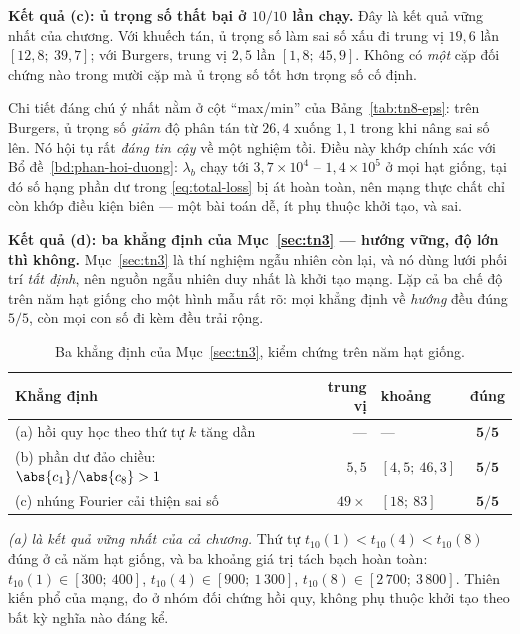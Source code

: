 \textbf{Kết quả (c): ủ trọng số thất bại ở $10/10$ lần chạy.} Đây là kết quả
vững nhất của chương. Với khuếch tán, ủ trọng số làm sai số xấu đi trung vị
$19{,}6$ lần $[12{,}8;\ 39{,}7]$; với Burgers, trung vị $2{,}5$ lần
$[1{,}8;\ 45{,}9]$. Không có \emph{một} cặp đối chứng nào trong mười cặp mà ủ
trọng số tốt hơn trọng số cố định.

Chi tiết đáng chú ý nhất nằm ở cột ``max/min'' của
Bảng~\ref{tab:tn8-eps}: trên Burgers, ủ trọng số \emph{giảm} độ phân tán từ
$26{,}4$ xuống $1{,}1$ trong khi nâng sai số lên. Nó hội tụ rất \emph{đáng tin
cậy} về một nghiệm tồi. Điều này khớp chính xác với
Bổ đề~\ref{bd:phan-hoi-duong}: $\lambda_b$ chạy tới $3{,}7\times10^{4}$ --
$1{,}4\times10^{5}$ ở mọi hạt giống, tại đó số hạng phần dư trong
\eqref{eq:total-loss} bị át hoàn toàn, nên mạng thực chất chỉ còn khớp điều kiện
biên --- một bài toán dễ, ít phụ thuộc khởi tạo, và sai.

\textbf{Kết quả (d): ba khẳng định của Mục~\ref{sec:tn3} --- hướng vững, độ lớn
thì không.} Mục~\ref{sec:tn3} là thí nghiệm ngẫu nhiên còn lại, và nó dùng lưới
phối trí \emph{tất định}, nên nguồn ngẫu nhiên duy nhất là khởi tạo mạng. Lặp cả
ba chế độ trên năm hạt giống cho một hình mẫu rất rõ: mọi khẳng định về
\emph{hướng} đều đúng $5/5$, còn mọi con số đi kèm đều trải rộng.

\begin{table}[H]
\centering
\caption[Ba khẳng định của Thí nghiệm 3 trên năm hạt giống]{Ba khẳng định của
Mục~\ref{sec:tn3}, kiểm chứng trên năm hạt giống.}
\label{tab:tn8-pho}
\small
\setlength{\tabcolsep}{5pt}
\begin{tabular}{@{}p{5.3cm} r l c@{}}
\toprule
\textbf{Khẳng định} & \textbf{trung vị} & \textbf{khoảng} & \textbf{đúng} \\
\midrule
(a) hồi quy học theo thứ tự $k$ tăng dần
  & --- & --- & $\mathbf{5/5}$ \\
(b) phần dư đảo chiều: $\abs{c_1}/\abs{c_8} > 1$
  & $5{,}5$ & $[4{,}5;\ 46{,}3]$ & $\mathbf{5/5}$ \\
(c) nhúng Fourier cải thiện sai số
  & $49\times$ & $[18;\ 83]$ & $\mathbf{5/5}$ \\
\bottomrule
\end{tabular}
\end{table}

\emph{(a) là kết quả vững nhất của cả chương.} Thứ tự $t_{10}(1) < t_{10}(4) <
t_{10}(8)$ đúng ở cả năm hạt giống, và ba khoảng giá trị tách bạch hoàn toàn:
$t_{10}(1) \in [300;\ 400]$, $t_{10}(4) \in [900;\ 1\,300]$,
$t_{10}(8) \in [2\,700;\ 3\,800]$. Thiên kiến phổ của mạng, đo ở nhóm đối
chứng hồi quy, không phụ thuộc khởi tạo theo bất kỳ nghĩa nào đáng kể.

